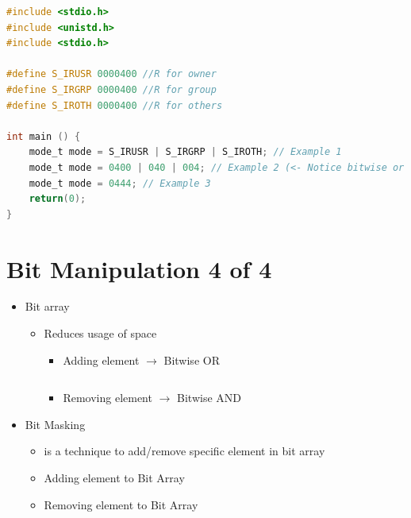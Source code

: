 \documentclass[12pt]{article}
\begin{document}
\begin{itemize}
\begin{itemize}
\begin{lstlisting}[language=c]
#include <stdio.h>
#include <unistd.h>
#include <stdio.h>

#define S_IRUSR 0000400 //R for owner
#define S_IRGRP 0000400 //R for group
#define S_IROTH 0000400 //R for others

int main () {
    mode_t mode = S_IRUSR | S_IRGRP | S_IROTH; // Example 1
    mode_t mode = 0400 | 040 | 004; // Example 2 (<- Notice bitwise or is used)
    mode_t mode = 0444; // Example 3
    return(0);
}
\end{lstlisting}

    \end{itemize}
\end{itemize}



\bigskip

\section*{Bit Manipulation 4 of 4}

\bigskip

\begin{itemize}
    \item Bit array
    \begin{itemize}
        \item Reduces usage of space
        \begin{itemize}
            \item Adding element $\to$ Bitwise OR

    \begin{lstlisting}[language=c]

    \end{lstlisting}

            \item Removing element $\to$ Bitwise AND
        \end{itemize}
    \end{itemize}
    \item Bit Masking
    \begin{itemize}
        \item is a technique to add/remove specific element in bit array
        \item Adding element to Bit Array
        \item Removing element to Bit Array
    \end{itemize}
\end{itemize}
\end{document}
